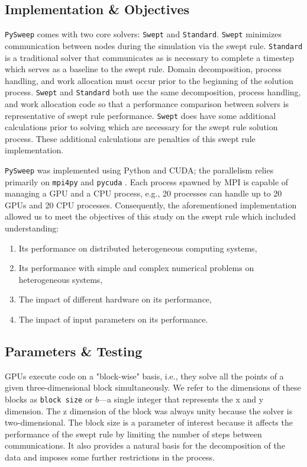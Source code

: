 \documentclass[journal,article,submit,moreauthors,pdftex]{Definitions/mdpi}
\def\pysweep{\texttt{PySweep}}
\def\Swept{\texttt{Swept}}
\def\Standard{\texttt{Standard}}
\begin{document}
\subsection{Implementation \& Objectives}
\pysweep{} comes with two core solvers: \Swept{} and \Standard{}. \Swept{} minimizes communication between nodes during the simulation via the swept rule. \Standard{} is a traditional solver that communicates as is necessary to complete a timestep which serves as a baseline to the swept rule. Domain decomposition, process handling, and work allocation must occur prior to the beginning of the solution process. \Swept{} and \Standard{} both use the same decomposition, process handling, and work allocation code so that a performance comparison between solvers is representative of swept rule performance. \Swept{} does have some additional calculations prior to solving which are necessary for the swept rule solution process. These additional calculations are penalties of this swept rule implementation. 

\par
\pysweep{} was implemented using Python and CUDA; the parallelism relies primarily on \texttt{mpi4py} and \texttt{pycuda} \cite{DalcinMPIPython, KlocknerPyCUDAGeneration}. Each process spawned by MPI is capable of managing a GPU and a CPU process, e.g., 20 processes can handle up to 20 GPUs and 20 CPU processes. Consequently, the aforementioned implementation allowed us to meet the objectives of this study on the swept rule which included understanding:
\begin{enumerate}
    \item Its performance on distributed heterogeneous computing systems,
    \item Its performance with simple and complex numerical problems on heterogeneous systems,
    \item The impact of different hardware on its performance,
    \item The impact of input parameters on its performance.
\end{enumerate}

\subsection{Parameters \& Testing}
\label{parameters-section}

GPUs execute code on a "block-wise" basis, i.e., they solve all the points of a given three-dimensional block simultaneously. We refer to the dimensions of these blocks as \texttt{block size} or $b$---a single integer that represents the x and y dimension. The z dimension of the block was always unity because the solver is two-dimensional. The block size is a parameter of interest because it affects the performance of the swept rule by limiting the number of steps between communications. It also provides a natural basis for the decomposition of the data and imposes some further restrictions in the process.
\end{document}
